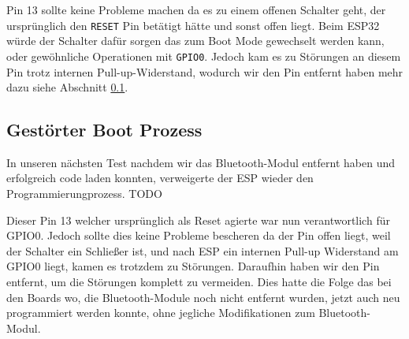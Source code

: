 Pin 13 sollte keine Probleme machen da es zu einem offenen Schalter geht,
der ursprünglich den \texttt{RESET} Pin betätigt hätte und sonst offen liegt. 
Beim ESP32 würde der Schalter dafür sorgen das zum Boot Mode gewechselt werden kann, 
oder gewöhnliche Operationen mit \texttt{GPIO0}. 
Jedoch kam es zu Störungen an diesem Pin trotz internen Pull-up-Widerstand, 
wodurch wir den Pin entfernt haben mehr dazu siehe Abschnitt \ref{subsec:gestoert_boot}.


\subsection{Gestörter Boot Prozess}
\label{subsec:gestoert_boot}
In unseren nächsten Test nachdem wir das Bluetooth-Modul entfernt haben 
und erfolgreich code laden konnten, verweigerte der ESP wieder den Programmierungprozess.
TODO

Dieser Pin 13 welcher ursprünglich als Reset agierte war nun verantwortlich für GPIO0. 
Jedoch sollte dies keine Probleme bescheren da der Pin offen liegt, weil der Schalter ein Schließer ist,
und nach ESP ein internen Pull-up Widerstand am GPIO0 liegt, kamen es trotzdem zu Störungen.
Daraufhin haben wir den Pin entfernt, um die Störungen komplett zu vermeiden. 
Dies hatte die Folge das bei den Boards wo, die Bluetooth-Module noch nicht entfernt wurden,
jetzt auch neu programmiert werden konnte, ohne jegliche Modifikationen zum Bluetooth-Modul.
